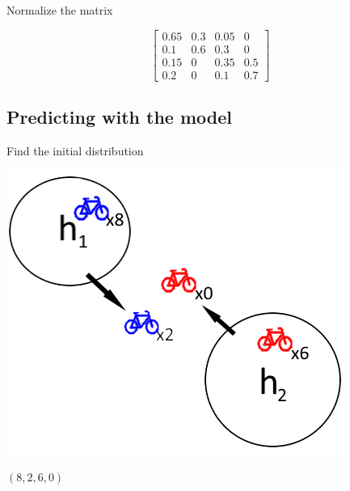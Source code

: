 \begin{frame}{Normalize the matrix}
	
	\begin{center}
		
		
		
		
		$$
		\begin{bmatrix}
			0.65 & 0.3 & 0.05 & 0\\
			0.1  & 0.6 & 0.3  & 0\\
			0.15 & 0   & 0.35 & 0.5\\
			0.2  & 0   & 0.1  & 0.7
		\end{bmatrix} 
		$$
		
	\end{center}
	
\end{frame}

\subsection{Predicting with the model}

\begin{frame}{Find the initial distribution}
	
\begin{center}

\includegraphics[scale=0.7]{graphics/initialworld2}
	
$ (8,2,6,0) $
\end{center}
\end{frame}

